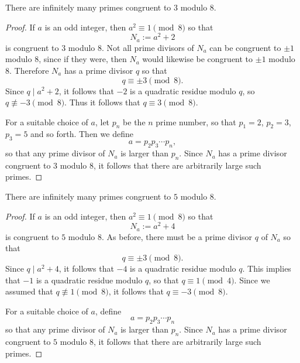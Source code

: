\begin{theorem}
  There are infinitely many primes congruent to $3$ modulo $8$.
\end{theorem}

\begin{proof}
  If $a$ is an odd integer, then $a^2\equiv 1\pmod{8}$ so that
  \begin{equation*}
    N_a := a^2+2
  \end{equation*}
  is congruent to $3$ modulo $8$. Not all prime divisors of $N_a$ can be congruent to $\pm 1$ modulo $8$, since if they were, then $N_a$ would likewise be congruent to $\pm 1$ modulo $8$. Therefore $N_a$ has a prime divisor $q$ so that
  \begin{equation*}
    q\equiv \pm{3}\pmod{8}.
  \end{equation*}
  Since $q\mid a^2+2$, it follows that $-2$ is a quadratic residue modulo $q$, so $q\nequiv-3\pmod{8}$. Thus it follows that $q\equiv 3\pmod{8}$.

  For a suitable choice of $a$, let $p_n$ be the $n$\supth{} prime number, so that $p_1=2$, $p_2=3$, $p_3=5$ and so forth. Then we define
  \begin{equation*}
    a=p_2p_3\cdots p_n,
  \end{equation*}
  so that any prime divisor of $N_a$ is larger than $p_n$. Since $N_a$ has a prime divisor congruent to $3$ modulo $8$, it follows that there are arbitrarily large such primes.
\end{proof}

\begin{theorem}
  There are infinitely many primes congruent to $5$ modulo $8$.
\end{theorem}

\begin{proof}
  If $a$ is an odd integer, then $a^2\equiv 1\pmod{8}$ so that
  \begin{equation*}
    N_a := a^2+4
  \end{equation*}
  is congruent to $5$ modulo $8$. As before, there must be a prime divisor $q$ of $N_a$ so that
  \begin{equation*}
    q\equiv \pm{3}\pmod{8}.
  \end{equation*}
  Since $q\mid a^2+4$, it follows that $-4$ is a quadratic residue modulo $q$. This implies that $-1$ is a quadratic residue modulo $q$, so that $q\equiv 1\pmod{4}$. Since we assumed that $q\nequiv 1\pmod{8}$, it follows that $q\equiv -3\pmod{8}$.

  For a suitable choice of $a$, define
  \begin{equation*}
    a=p_2p_3\cdots p_n
  \end{equation*}
  so that any prime divisor of $N_a$ is larger than $p_n$. Since $N_a$ has a prime divisor congruent to $5$ modulo $8$, it follows that there are arbitrarily large such primes.
\end{proof}

